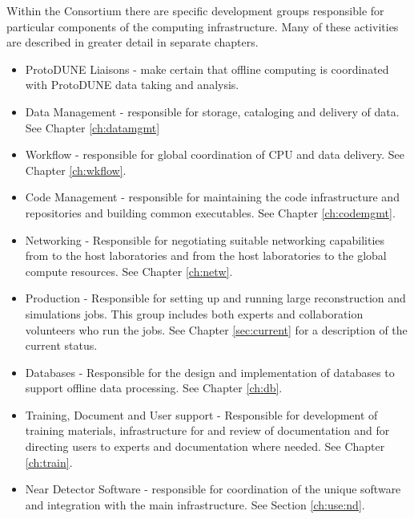 \documentclass[../main-v1.tex]{subfiles}
\begin{document}
Within the Consortium there are specific development groups responsible for particular components of the computing infrastructure.  Many of these activities are described in greater detail in separate chapters. 

\begin{itemize} 
\item ProtoDUNE Liaisons - make certain that offline computing is coordinated with ProtoDUNE data taking and analysis.

\item Data Management - responsible for storage, cataloging and delivery of data. See Chapter \ref{ch:datamgmt}

\item Workflow - responsible for global coordination of CPU and data delivery. See Chapter \ref{ch:wkflow}.


\item Code Management - responsible for maintaining the code infrastructure and  repositories and building common executables.  See Chapter \ref{ch:codemgmt}.

\item{Networking} -  Responsible for negotiating suitable networking capabilities from  to the host laboratories and from the host laboratories to the global compute resources.  See Chapter \ref{ch:netw}. 

\item{Production} - Responsible for setting up and running large reconstruction and simulations jobs. This group includes both experts and collaboration volunteers who run the jobs. See Chapter \ref{sec:current} for a description of the current status. 


\item{Databases} - Responsible for the design and implementation of databases to support offline data processing. See Chapter \ref{ch:db}.

\item{Training, Document and User support} - Responsible for development of training materials, infrastructure for and review of documentation and for directing users to experts and documentation where needed. See Chapter \ref{ch:train}.

\item Near Detector Software - responsible for coordination of the unique  software and integration with the main  infrastructure. See Section \ref{ch:use:nd}. 

\end{itemize}
\end{document}
